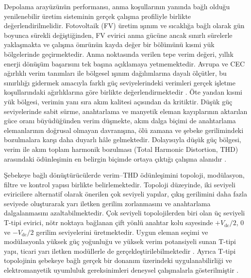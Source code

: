Depolama arayüzünün performansı, anma koşullarının yanında bağlı olduğu yenilenebilir üretim sisteminin gerçek çalışma profiliyle birlikte değerlendirilmelidir. Fotovoltaik (FV) üretim ışınım ve sıcaklığa bağlı olarak gün boyunca sürekli değiştiğinden, FV evirici anma gücüne ancak sınırlı sürelerle yaklaşmakta ve çalışma ömrünün kayda değer bir bölümünü kısmi yük bölgelerinde geçirmektedir. Anma noktasında verilen tepe verim değeri, yıllık enerji dönüşüm başarısını tek başına açıklamaya yetmemektedir. Avrupa ve CEC ağırlıklı verim tanımları ile bölgesel ışınım dağılımlarına dayalı ölçütler, bu sınırlılığı gidermek amacıyla farklı güç seviyelerindeki verimleri gerçek işletme koşullarındaki ağırlıklarına göre birlikte değerlendirmektedir \citep{Meinhardt2000,Sera2008,Sandia2015,Ongun2013}. Öte yandan kısmi yük bölgesi, verimin yanı sıra akım kalitesi açısından da kritiktir. Düşük güç seviyelerinde sabit sürme, anahtarlama ve manyetik eleman kayıplarının aktarılan güce oranı büyüdüğünden verim düşmekte, akım dalga biçimi de anahtarlama elemanlarının doğrusal olmayan davranışına, ölü zamana ve şebeke gerilimindeki bozulmalara karşı daha duyarlı hâle gelmektedir. Dolayısıyla düşük güç bölgesi, verim ile akım toplam harmonik bozulması (Total Harmonic Distortion, THD) arasındaki ödünleşimin en belirgin biçimde ortaya çıktığı çalışma alanıdır \citep{Kjaer2005,Chicco2009}.

Şebekeye bağlı dönüştürücülerde verim--THD ödünleşimini topoloji, modülasyon, filtre ve kontrol yapısı birlikte belirlemektedir. Topoloji düzeyinde, iki seviyeli eviricilere alternatif olarak önerilen çok seviyeli yapılar, çıkış gerilimini daha fazla seviyede oluşturarak yarı iletken gerilim zorlanmasını ve anahtarlama dalgalanmasını azaltabilmektedir. Çok seviyeli topolojilerden biri olan üç seviyeli T-tipi evirici, nötr noktaya bağlanan çift yönlü anahtar kolu sayesinde $+V_{\mathrm{dc}}/2$, $0$ ve $-V_{\mathrm{dc}}/2$ gerilim seviyelerini üretmektedir. Uygun eleman seçimi ve modülasyonla yüksek güç yoğunluğu ve yüksek verim potansiyeli sunan T-tipi yapı, ticari yarı iletken modüllerle de gerçekleştirilebilmektedir \citep{Wang2020}. Ayrıca T-tipi topolojinin şebekeye bağlı gerçek bir donanım üzerindeki uygulanabilirliği ve elektromanyetik uyumluluk gereksinimleri deneysel çalışmalarla gösterilmiştir \citep{Hizarci2021}.

